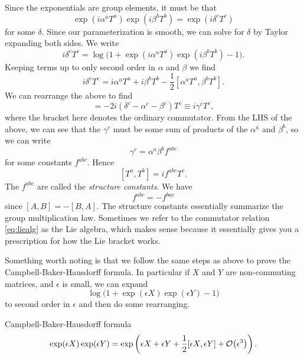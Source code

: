 Since the exponentials are group elements, it must be that
\begin{equation}
  \exp(i\alpha^aT^a)\exp(i\beta^bT^b)=\exp(i\delta^cT^c)
\end{equation}
for some $\delta$. Since our parameterization is smooth, we can solve for
$\delta$ by Taylor expanding both sides. We write
\begin{equation}
  i\delta^cT^c=\log\big(1+\exp(i\alpha^aT^a)\exp(i\beta^bT^b)-1\big).
\end{equation}
Keeping terms up to only second order in $\alpha$ and $\beta$ we find
\begin{equation}
  i\delta^cT^c=i\alpha^aT^a+i\beta^bT^b-\frac{1}{2}[\alpha^aT^a,\beta^bT^b].
\end{equation}
We can rearrange the above to find
\begin{equation}
  [\alpha^aT^a,\beta^bT^b]=
   -2i(\delta^c-\alpha^c-\beta^c)T^c\equiv i\gamma^cT^c,
\end{equation}
where the bracket here denotes the ordinary commutator.
From the LHS of the above, we can see that the $\gamma^c$ must be some
sum of products of the $\alpha^a$ and $\beta^b$, so we can write
\begin{equation}\label{eq:gammac}
  \gamma^c=\alpha^a\beta^bf^{abc}
\end{equation}
for some constants $f^{abc}$. Hence
\begin{equation}\label{eq:liealg}
  [T^a,T^b]=if^{abc}T^c.
\end{equation}
The $f^{abc}$ are called the {\it structure constants}. 
We have
\begin{equation}
  f^{abc}=-f^{bac}
\end{equation}
since $[A,B]=-[B,A]$. The structure constants essentially summarize the
group multiplication law. Sometimes we refer to the commutator relation
\eqref{eq:liealg} as the Lie algebra, which makes sense because it
essentially gives you a prescription for how the Lie bracket works.

Something worth noting is that we follow the same steps
as above to prove the Campbell-Baker-Hausdorff formula. In particular
if $X$ and $Y$ are non-commuting matrices, and $\epsilon$ is small,
we can expand
\begin{equation}
  \log\big(1+\exp(\epsilon X)\exp(\epsilon Y)-1\big)
\end{equation}
to second order in $\epsilon$ and then do some rearranging.
\begin{theorem}{Campbell-Baker-Hausdorff formula}{}
  $$
    \exp(\epsilon X)\exp(\epsilon Y)
      =\exp\left(\epsilon X+\epsilon Y+\frac{1}{2}[\epsilon X,\epsilon Y]
                           +\order{\epsilon^3}\right).
  $$
\end{theorem}

